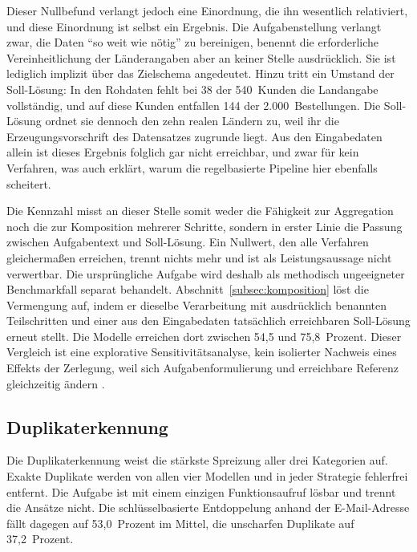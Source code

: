 Dieser Nullbefund verlangt jedoch eine Einordnung, die ihn wesentlich relativiert, und diese Einordnung ist selbst ein Ergebnis. Die Aufgabenstellung verlangt zwar, die Daten \enquote{so weit wie nötig} zu bereinigen, benennt die erforderliche Vereinheitlichung der Länderangaben aber an keiner Stelle ausdrücklich. Sie ist lediglich implizit über das Zielschema angedeutet. Hinzu tritt ein Umstand der Soll-Lösung: In den Rohdaten fehlt bei 38 der 540~Kunden die Landangabe vollständig, und auf diese Kunden entfallen 144 der 2.000~Bestellungen. Die Soll-Lösung ordnet sie dennoch den zehn realen Ländern zu, weil ihr die Erzeugungsvorschrift des Datensatzes zugrunde liegt. Aus den Eingabedaten allein ist dieses Ergebnis folglich gar nicht erreichbar, und zwar für kein Verfahren, was auch erklärt, warum die regelbasierte Pipeline hier ebenfalls scheitert.

Die Kennzahl misst an dieser Stelle somit weder die Fähigkeit zur Aggregation noch die zur Komposition mehrerer Schritte, sondern in erster Linie die Passung zwischen Aufgabentext und Soll-Lösung. Ein Nullwert, den alle Verfahren gleichermaßen erreichen, trennt nichts mehr und ist als Leistungsaussage nicht verwertbar. Die ursprüngliche Aufgabe wird deshalb als methodisch ungeeigneter Benchmarkfall separat behandelt. Abschnitt~\ref{subsec:komposition} löst die Vermengung auf, indem er dieselbe Verarbeitung mit ausdrücklich benannten Teilschritten und einer aus den Eingabedaten tatsächlich erreichbaren Soll-Lösung erneut stellt. Die Modelle erreichen dort zwischen 54,5 und 75,8~Prozent. Dieser Vergleich ist eine explorative Sensitivitätsanalyse, kein isolierter Nachweis eines Effekts der Zerlegung, weil sich Aufgabenformulierung und erreichbare Referenz gleichzeitig ändern \autocite{mumuniAutomatedDataProcessing2025}.

\subsection{Duplikaterkennung}
\label{subsec:ergebnisse-duplikate}

Die Duplikaterkennung weist die stärkste Spreizung aller drei Kategorien auf. Exakte Duplikate werden von allen vier Modellen und in jeder Strategie fehlerfrei entfernt. Die Aufgabe ist mit einem einzigen Funktionsaufruf lösbar und trennt die Ansätze nicht. Die schlüsselbasierte Entdoppelung anhand der E-Mail-Adresse fällt dagegen auf 53,0~Prozent im Mittel, die unscharfen Duplikate auf 37,2~Prozent.

